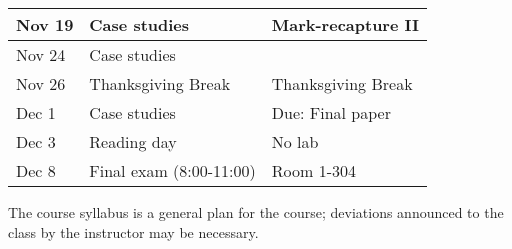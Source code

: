 \documentclass[12pt]{article}
\begin{document}
\begin{center}
\begin{tabular}[c]{lll}
Nov 19     & Case studies                       & Mark-recapture II                   \\
\hline
Nov 24     & Case studies                       &                                      \\
Nov 26     & Thanksgiving Break                 & Thanksgiving Break                    \\
\hline
Dec 1      & Case studies                       & Due: Final paper                     \\
Dec 3      & Reading day                        & No lab                               \\
\hline
Dec 8     & Final exam (8:00-11:00)            &  Room 1-304                                 \\
\hline \hline
\end{tabular}
\end{center}

The course syllabus is a general plan for the course; deviations announced to the class by the instructor may be necessary.
\end{document}
